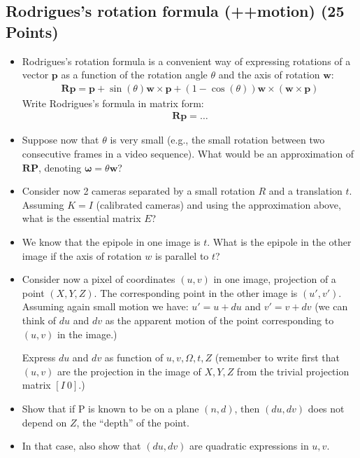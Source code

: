 \documentclass[11pt]{article}
\newcommand{\mat}[1]{\mathbf{#1}}
\begin{document}
\subsection{Rodrigues's rotation formula (++motion) (25 Points)}
\begin{itemize}

\item Rodrigues's rotation formula is a convenient way of expressing rotations of a vector $\mat{p}$ as 
a function of the rotation angle $\theta$ and the axis of rotation $\mat{w}$:
\begin{align*}
\mat{R}\mat{p} = \mat{p} + \sin(\theta) \mat{w} \times \mat{p} + (1 - \cos(\theta)) \mat{w} \times(\mat{w} \times \mat{p})
\end{align*}
Write Rodrigues's formula in matrix form:
\begin{align*}
\mat{R}\mat{p}=\ldots
\end{align*}
\item Suppose now that $\theta$ is very small (e.g., the small rotation between two consecutive frames in a video sequence). 
What would be an approximation of $\mat{RP}$, denoting $\mat{\omega} = \theta \mat{w}$?
\item Consider now 2 cameras separated by a small rotation $R$ and a translation $t$. Assuming $K=I$ (calibrated cameras) and using the approximation above, what is
the essential matrix $E$?

\item We know that the epipole in one image is $t$. What is the epipole in the 
other image if the axis of rotation $w$ is parallel to $t$?

\item Consider now a pixel of coordinates $(u,v)$ in one image, projection
of a point $(X,Y,Z)$. The corresponding point in the other image is $(u',v')$. 
Assuming again small motion we have: $u' = u + du$ and $v' = v + dv$ (we can
think of $du$ and $dv$ as the apparent motion of the point corresponding to $(u,v)$
in the image.)

Express $du$ and $dv$ as function of $u,v,\Omega,t,Z$ (remember to write first that $(u,v)$ are
the projection in the image of $X,Y,Z$ from the trivial projection matrix $[I\ 0]$.)

\item Show that if P is known to be on a plane $(n,d)$, then $(du,dv)$ does not depend on $Z$, the 
``depth'' of the point.

\item In that case, also show that $(du,dv)$ are quadratic expressions in $u,v$.


\end{itemize}
\end{document}
